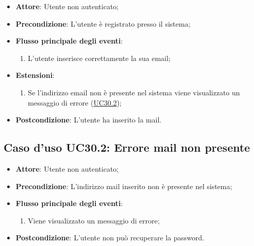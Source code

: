 \documentclass[12pt,a4paper]{article}
\begin{document}
\begin{itemize}

\item \textbf{Attore}: Utente non autenticato; 
\item \textbf{Precondizione}: L'utente è registrato presso il sistema;

\item \textbf{Flusso principale degli eventi}:
\begin{enumerate}
	\item L'utente inserisce correttamente la sua email;
	
\end{enumerate}
\item \textbf{Estensioni}:
\begin{enumerate}
	\item Se l'indirizzo email non è presente nel sistema viene visualizzato un messaggio di errore (\hyperlink{UC30.2}{UC30.2});
	
\end{enumerate}
\item \textbf{Postcondizione}: L'utente ha inserito la mail.
\end{itemize}
\hypertarget{UC30.2}{}
\subsection{Caso d'uso UC30.2: Errore mail non presente}

\begin{itemize}

\item \textbf{Attore}: Utente non autenticato; 
\item \textbf{Precondizione}: L'indirizzo mail inserito non è presente nel sistema;

\item \textbf{Flusso principale degli eventi}:
\begin{enumerate}
	\item Viene visualizzato un messaggio di errore;
	
\end{enumerate}
\item \textbf{Postcondizione}: L'utente non può recuperare la password.
\end{itemize}
\hypertarget{UC31}{}
\end{document}
